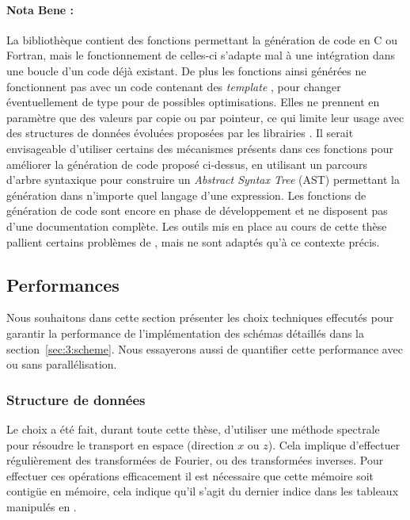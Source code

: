 \paragraph{Nota Bene :} La bibliothèque \sympy{} contient des fonctions permettant la génération de code en C ou Fortran, mais le fonctionnement de celles-ci s'adapte mal à une intégration dans une boucle d'un code déjà existant. De plus les fonctions ainsi générées ne fonctionnent pas avec un code contenant des \emph{template} \CC, pour changer éventuellement de type pour de possibles optimisations. Elles ne prennent en paramètre que des valeurs par copie ou par pointeur, ce qui limite leur usage avec des structures de données évoluées proposées par les librairies \CC. Il serait envisageable d'utiliser certains des mécanismes présents dans ces fonctions pour améliorer la génération de code proposé ci-dessus, en utilisant un parcours d'arbre syntaxique pour construire un \emph{Abstract Syntax Tree} (AST) permettant la génération dans n'importe quel langage d'une expression. Les fonctions \sympy{} de génération de code sont encore en phase de développement et ne disposent pas d'une documentation complète. Les outils mis en place au cours de cette thèse pallient certains problèmes de \sympy{}, mais ne sont adaptés qu'à ce contexte précis.

\subsection{Performances}

Nous souhaitons dans cette section présenter les choix techniques effecutés pour garantir la performance de l'implémentation des schémas détaillés dans la section~\ref{sec:3:scheme}. Nous essayerons aussi de quantifier cette performance avec ou sans parallélisation.

\subsubsection{Structure de données}

Le choix a été fait, durant toute cette thèse, d'utiliser une méthode spectrale pour résoudre le transport en espace (direction $x$ ou $z$). Cela implique d'effectuer régulièrement des transformées de Fourier, ou des transformées inverses. Pour effectuer ces opérations efficacement il est nécessaire que cette mémoire soit contigüe en mémoire, cela indique qu'il s'agit du dernier indice dans les tableaux manipulés en \CC. 

